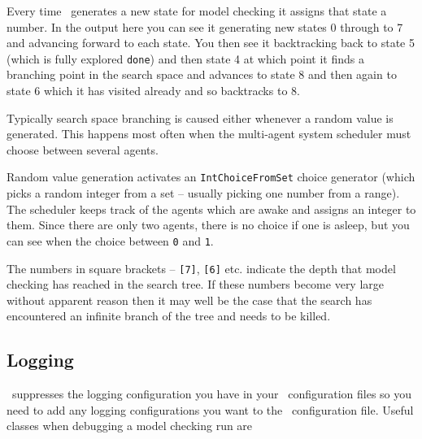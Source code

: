 Every time \jpf\ generates a new state for model checking it assigns that state a number.  In the output here you can see it generating new states 0 through to 7 and advancing forward to each state.  You then see it backtracking back to state 5 (which is fully explored \texttt{done}) and then state 4 at which point it finds a branching point in the search space and advances to state 8 and then again to state 6 which it has visited already and so backtracks to 8.

Typically search space branching is caused either whenever a random value is generated.  This happens most often when the multi-agent system scheduler must choose between several agents.

Random value generation activates an \texttt{IntChoiceFromSet} choice generator (which picks a random integer from a set -- usually picking one number from a range).  The scheduler keeps track of the agents which are awake and assigns an integer to them.  Since there are only two agents, there is no choice if one is asleep, but you can see when the choice between \texttt{0} and \texttt{1}.

The numbers in square brackets -- \texttt{[7]}, \texttt{[6]} etc. indicate the depth that model checking has reached in the search tree.  If these numbers become very large without apparent reason then it may well be the case that the search has encountered an infinite branch of the tree and needs to be killed.

\subsection{Logging}
\jpf\ suppresses the logging configuration you have in your \ail\ configuration files so you need to add any logging configurations you want to the \jpf\ configuration file.  Useful classes when debugging a model checking run are

